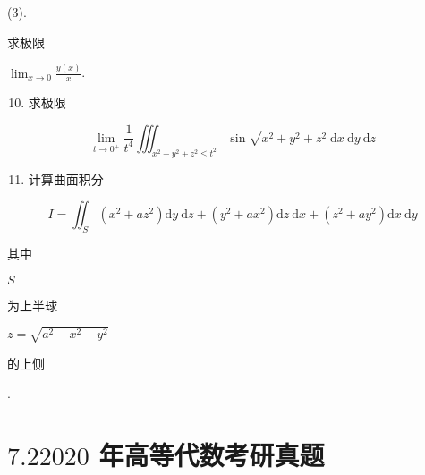 \documentclass[10pt]{article}
\begin{document}
(3). \begin{CJK}{UTF8}{mj}求极限\end{CJK} $\lim _{x \rightarrow 0} \frac{y(x)}{x}$.

\begin{enumerate}
  \setcounter{enumi}{9}
  \item \begin{CJK}{UTF8}{mj}求极限\end{CJK}
\end{enumerate}
$$
\lim _{t \rightarrow 0^{+}} \frac{1}{t^{4}} \iiint_{x^{2}+y^{2}+z^{2} \leq t^{2}} \sin \sqrt{x^{2}+y^{2}+z^{2}} \mathrm{~d} x \mathrm{~d} y \mathrm{~d} z
$$

\begin{enumerate}
  \setcounter{enumi}{10}
  \item \begin{CJK}{UTF8}{mj}计算曲面积分\end{CJK}
\end{enumerate}
$$
I=\iint_{S}\left(x^{2}+a z^{2}\right) \mathrm{d} y \mathrm{~d} z+\left(y^{2}+a x^{2}\right) \mathrm{d} z \mathrm{~d} x+\left(z^{2}+a y^{2}\right) \mathrm{d} x \mathrm{~d} y
$$
\begin{CJK}{UTF8}{mj}其中\end{CJK} $S$ \begin{CJK}{UTF8}{mj}为上半球\end{CJK} $z=\sqrt{a^{2}-x^{2}-y^{2}}$ \begin{CJK}{UTF8}{mj}的上侧\end{CJK}.

\section{$7.22020$ 年高等代数考研真题}
\end{document}
